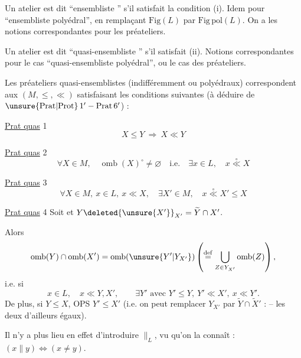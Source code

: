 
\uline{} Un atelier est dit ``ensembliste '' s'il satisfait la condition (i). Idem pour ``ensembliste polyédral'', en remplaçant $\mathrm{Fig}(L)$ par $\mathrm{Fig}\,\mathrm{pol}(L)$. On a les  notions correspondantes pour les préateliers.


Un atelier est dit ``quasi-ensembliste '' s'il satisfait (ii). Notions correspondantes pour le cas ``quasi-ensembliste polyédral'', ou le cas des préateliers.

Les préateliers quasi-ensemblistes (indifféremment  ou polyédraux) correspondent aux $(M,\leq,\ll)$ satisfaisant les conditions suivantes (à déduire de $\unsure{\mathrm{Prat}|\mathrm{Prot}}\,1'-\mathrm{Prat}\,6'$) :

\uline{Prat quas} 1
\[
X\leq Y\ \Rightarrow\ X\ll Y
\]

\uline{Prat quas} 2
\[
\forall X\in M,\quad\operatorname{omb}(X)^\circ\ne\varnothing\quad\text{i.e.}\quad\exists x\in L,\quad x\overset{\circ}{\ll}X
\]

\uline{Prat quas} 3
\[
\forall X\in M,\ x\in L,\ x\ll X,\quad\exists X'\in M,\quad x\overset{\circ}{\ll}X'\leq X
\]

\uline{Prat quas} 4 Soit
 et $Y\deleted{\unsure{X'}}_{X'}=\widetilde Y\cap X'$.

Alors
\[
\operatorname{omb}(Y)\cap\operatorname{omb}(X')=\operatorname{omb}(\unsure{Y'|Y_{X'}})\left(\overset{\mathrm{def}}{=}\bigcup_{Z\in Y_{X'}}\operatorname{omb}(Z)\right),
\]
i.e. si
\[
x\in L,\quad x\ll Y,X',\qquad\exists Y'\text{ avec }Y'\leq Y,\ Y'\ll X',\ x\ll Y'.
\]
De plus, si $Y\leq X$, OPS $Y'\leq X'$ (i.e. on peut remplacer $Y_{X'}$ par $\widetilde Y\cap\widetilde X'$ : -- les deux  d'ailleurs égaux).

Il n'y a plus lieu en effet d'introduire $\parallel_L$, vu qu'on la connaît :  $(x\parallel y)\Longleftrightarrow(x\ne y)$.
